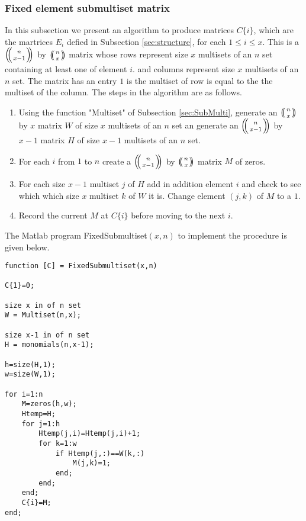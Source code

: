 \documentclass{article}
\theoremstyle{plain}
\theoremstyle{definition}
\numberwithin{thm}{section}
\begin{document}
			
			\subsubsection{Fixed element submultiset matrix}\label{sec:FixedSubmultiset}
			
				In this subsection we present an algorithm to produce matrices $C\{ i \}$, which are the martrices $E_i$ defied in Subsection \ref{sec:structure},
				for each $1 \leq i \leq x$.
				This is a ${\ensuremath{\left(\kern-.3em\left(\genfrac{}{}{0pt}{}{{n}}{{x-1}}\right)\kern-.3em\right)}}$ by ${\ensuremath{\left(\kern-.3em\left(\genfrac{}{}{0pt}{}{{n}}{{x}}\right)\kern-.3em\right)}}$ matrix whose rows represent size $x$ multisets of an $n$ set containing  at least one of element $i$. 
				and columns represent size $x$ multisets of an $n$ set.
				The matrix has an entry $1$ is the multiset of row is equal to the the multiset of the column.  
				The steps in the algorithm are as follows.
					\begin{enumerate}
						\item
							Using the function "Multiset" of Subsection \ref{sec:SubMulti},
							generate an ${\ensuremath{\left(\kern-.3em\left(\genfrac{}{}{0pt}{}{{n}}{{x}}\right)\kern-.3em\right)}}$ by $x$ matrix $W$ of size $x$ multisets of an $n$ set
							an generate an ${\ensuremath{\left(\kern-.3em\left(\genfrac{}{}{0pt}{}{{n}}{{x-1}}\right)\kern-.3em\right)}}$ by $x-1$ matrix $H$ of size $x-1$ multisets of an $n$ set.
						\item
							For each $i$ from $1$ to $n$ create a ${\ensuremath{\left(\kern-.3em\left(\genfrac{}{}{0pt}{}{{n}}{{x-1}}\right)\kern-.3em\right)}}$ by ${\ensuremath{\left(\kern-.3em\left(\genfrac{}{}{0pt}{}{{n}}{{x}}\right)\kern-.3em\right)}}$ matrix $M$ of zeros.
						\item
							For each size $x-1$ multiset $j$ of $H$ add in addition element $i$ and check to see which which size $x$ multiset $k$ of $W$ it is.
							Change element $(j,k)$ of $M$ to a $1$.
						\item
							Record the current $M$ at $C\{ i \}$ before moving to the next $i$.
					\end{enumerate}
			
				The Matlab program FixedSubmultiset$(x,n)$ to implement the procedure is given below.
				
				\begin{lstlisting}[frame=single]
function [C] = FixedSubmultiset(x,n)
 
C{1}=0;
 
size x in of n set
W = Multiset(n,x);
 
size x-1 in of n set
H = monomials(n,x-1);
 
h=size(H,1);
w=size(W,1);
 
for i=1:n
    M=zeros(h,w);
    Htemp=H;
    for j=1:h
        Htemp(j,i)=Htemp(j,i)+1;
        for k=1:w
            if Htemp(j,:)==W(k,:)
                M(j,k)=1;        
            end;
        end;
    end;
    C{i}=M;
end;
				\end{lstlisting}
				
\end{document}
